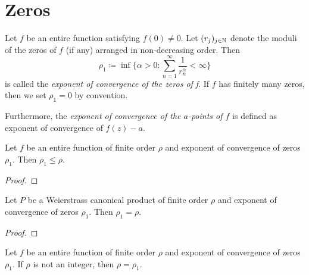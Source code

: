 \chapter{Zeros}
\label{ch:zeros}


\begin{definition}
    Let $f$ be an entire function satisfying $f(0) \neq 0$. Let $(r_j)_{j \in \mathbb{N}}$ denote the moduli of the zeros of $f$ (if any) arranged in non-decreasing order. Then
    $$ \rho_1 \coloneqq \inf \{ \alpha > 0 : \sum_{n=1}^\infty \frac{1}{r^\alpha_n} < \infty \} $$
    is called the \emph{exponent of convergence of the zeros of f}. If $f$ has finitely many zeros, then we set $\rho_1 = 0$ by convention. 

    Furthermore, the \emph{exponent of convergence of the $a$-points of $f$} is defined as exponent of convergence of $f(z) - a$.
\end{definition}

\begin{theorem}
    Let $f$ be an entire function of finite order $\rho$ and exponent of convergence of zeros $\rho_1$. Then $\rho_1 \leq \rho$.
\end{theorem}

\begin{proof}
\end{proof}

\begin{example}
\end{example}

\begin{theorem}
    Let $P$ be a Weierstrass canonical product of finite order $\rho$ and exponent of convergence of zeros $\rho_1$. Then $\rho_1 = \rho$.
\end{theorem}

\begin{proof}
\end{proof}

\begin{theorem}
    Let $f$ be an entire function of finite order $\rho$ and exponent of convergence of zeros $\rho_1$. If $\rho$ is not an integer, then $\rho = \rho_1$.
\end{theorem}

